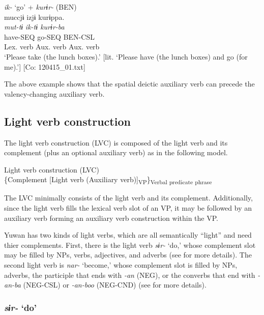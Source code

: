 \ea   \textit{ik-} ‘go’ + \textit{kurɨr-} (BEN) \label{ex:9.21}\\
 \gllll  muccjɨ  izjɨ  kurɨppa.\\
    \textit{mut-tɨ}  \textit{ik{}-tɨ  kurɨr{}-ba}\\
    have-SEQ  go-SEQ  BEN-CSL\\
    Lex. verb  Aux. verb  Aux. verb\\
    \glt     ‘Please take (the lunch boxes).’ [lit. ‘Please have (the lunch boxes) and go (for me).’] [Co: 120415\_01.txt]
\z

The above example shows that the spatial deictic auxiliary verb can precede the valency-changing auxiliary verb.

\subsection{Light verb construction}\label{sec:9.1.2}

The light verb construction (LVC) is composed of the light verb and its complement (plus an optional auxiliary verb) as in the following model.

\ea   Light verb construction (LVC) \label{ex:9.22}\\
  \{Complement \hspace{\tabcolsep} [Light verb \hspace{\tabcolsep} (Auxiliary verb)]\textsubscript{VP}\}\textsubscript{Verbal predicate phrase}
\z

The LVC minimally consists of the light verb and its complement. Additionally, since the light verb fills the lexical verb slot of an VP, it may be followed by an auxiliary verb forming an auxiliary verb construction within the VP.

Yuwan has two kinds of light verbs, which are all semantically “light” and need thier complements. First, there is the light verb \textit{sɨr-} ‘do,’ whose complement slot may be filled by NPs, verbs, adjectives, and adverbs (see  for more details). The second light verb is \textit{nar-} ‘become,’ whose complement slot is filled by NPs, adverbs, the participle that ends with \textit{{}-an} (NEG), or the converbs that end with \textit{{}-an-ba} (NEG-CSL) or \textit{{}-an-boo} (NEG-CND) (see  for more details).

\subsubsection{\textit{sɨr-} ‘do’}\label{sec:9.1.2.1}

